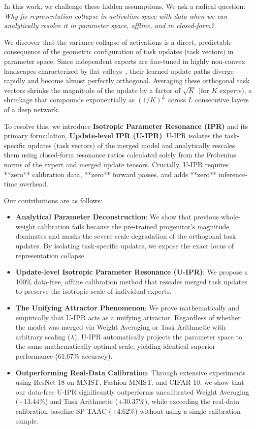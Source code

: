 \documentclass{article}
\begin{document}
In this work, we challenge these hidden assumptions. We ask a radical question: \textit{Why fix representation collapse in activation space with data when we can analytically resolve it in parameter space, offline, and in closed-form?}

We discover that the variance collapse of activations is a direct, predictable consequence of the geometric configuration of task updates (task vectors) in parameter space. Since independent experts are fine-tuned in highly non-convex landscapes characterized by flat valleys~\cite{zhang2017understanding, choromanska2015loss}, their learned update paths diverge rapidly and become almost perfectly orthogonal. Averaging these orthogonal task vectors shrinks the magnitude of the update by a factor of $\sqrt{K}$ (for $K$ experts), a shrinkage that compounds exponentially as $(1/K)^L$ across $L$ consecutive layers of a deep network.

To resolve this, we introduce \textbf{Isotropic Parameter Resonance (IPR)} and its primary formulation, \textbf{Update-level IPR (U-IPR)}. U-IPR isolates the task-specific updates (task vectors) of the merged model and analytically rescales them using closed-form resonance ratios calculated solely from the Frobenius norms of the expert and merged update tensors. Crucially, U-IPR requires **zero** calibration data, **zero** forward passes, and adds **zero** inference-time overhead.

Our contributions are as follows:
\begin{itemize}
    \setlength{\itemsep}{0pt}
    \setlength{\parskip}{0pt}
    \setlength{\parsep}{0pt}
    \item \textbf{Analytical Parameter Deconstruction}: We show that previous whole-weight calibration fails because the pre-trained progenitor's magnitude dominates and masks the severe scale degradation of the orthogonal task updates. By isolating task-specific updates, we expose the exact locus of representation collapse.
    \item \textbf{Update-level Isotropic Parameter Resonance (U-IPR)}: We propose a 100\% data-free, offline calibration method that rescales merged task updates to preserve the isotropic scale of individual experts.
    \item \textbf{The Unifying Attractor Phenomenon}: We prove mathematically and empirically that U-IPR acts as a unifying attractor. Regardless of whether the model was merged via Weight Averaging or Task Arithmetic with arbitrary scaling ($\lambda$), U-IPR automatically projects the parameter space to the same mathematically optimal scale, yielding identical superior performance (61.67\% accuracy).
    \item \textbf{Outperforming Real-Data Calibration}: Through extensive experiments using ResNet-18 on MNIST, Fashion-MNIST, and CIFAR-10, we show that our data-free U-IPR significantly outperforms uncalibrated Weight Averaging (+13.44\%) and Task Arithmetic (+30.37\%), while exceeding the real-data calibration baseline SP-TAAC (+4.62\%) without using a single calibration sample.
\end{itemize}
\end{document}
